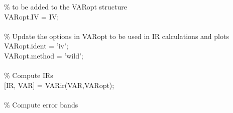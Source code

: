 \hspace{1mm}\hspace{5mm} \hspace{5mm} \textcolor{matlabgreen}{\% to be added to the VARopt structure }\\ 
\hspace{1mm}\hspace{5mm} \hspace{5mm} VARopt.IV = IV; \\ 
\hspace{1mm}\hspace{5mm} \hspace{5mm}  \\ 
\hspace{1mm}\hspace{5mm} \hspace{5mm} \textcolor{matlabgreen}{\% Update the options in VARopt to be used in IR calculations and plots }\\ 
\hspace{1mm}\hspace{5mm} \hspace{5mm} VARopt.ident = \textcolor{matlabpurple}{'iv'}; \\ 
\hspace{1mm}\hspace{5mm} \hspace{5mm} VARopt.method = \textcolor{matlabpurple}{'wild'}; \\ 
\hspace{1mm}\hspace{5mm} \hspace{5mm}  \\ 
\hspace{1mm}\hspace{5mm} \hspace{5mm} \textcolor{matlabgreen}{\% Compute IRs }\\ 
\hspace{1mm}\hspace{5mm} \hspace{5mm} [IR, VAR] = VARir(VAR,VARopt); \\ 
\hspace{1mm}\hspace{5mm} \hspace{5mm}  \\ 
\hspace{1mm}\hspace{5mm} \hspace{5mm} \textcolor{matlabgreen}{\% Compute error bands }\\ 
